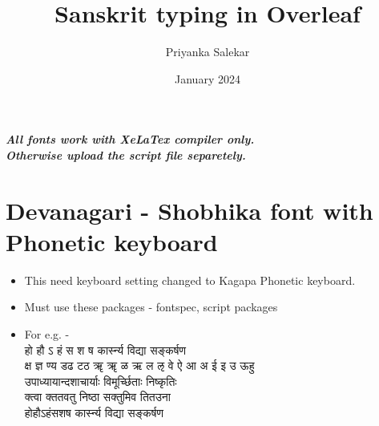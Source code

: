 \documentclass{article}
\title {Sanskrit typing in Overleaf}
\author{Priyanka Salekar}
\date{January 2024}
\begin{document}
\maketitle
\vspace{20mm}
{\begin{center}
 \large\textbf{\textit{All fonts work with XeLaTex compiler only.\\ Otherwise upload the script file separetely.}}   
\end{center}}
\pagebreak

\section{Devanagari - Shobhika font with Phonetic keyboard}
\begin{Large}
    \begin{itemize}
    \item This need keyboard setting changed to Kagapa Phonetic keyboard.
    
    \item Must use these packages - fontspec, script packages
    \item For e.g. -\\
{\scriptsize {\s हो हौ ऽ हं स श ष कार्स्न्य विद्या सङ्कर्षण}}\\
{\small {\s क्ष ज्ञ ण्य डढ टठ ॠ ॠ ळ ऋ ल ऌ वे ऐ आ अ ई इ उ ऊहु }}\\
{\large {\s उपाध्यायान्दशाचार्याः विमूर्च्छिताः निष्कृतिः}}\\
{\Large {\s क्त्वा क्ततवतु निष्ठा सक्तुमिव तितउना }}\\
{\huge {\s होहौऽहंसशष कार्स्न्य विद्या सङ्कर्षण}} 
\end{itemize}
\end{Large}
\pagebreak
\end{document}
